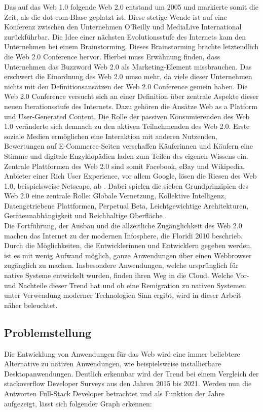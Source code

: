 \documentclass[a4paper]{scrartcl}
\begin{document}
Das auf das Web 1.0 folgende Web 2.0 entstand um 2005 und markierte somit die Zeit, als die dot-com-Blase geplatzt ist. Diese stetige Wende ist auf eine Konferenz zwischen den Unternehmen O'Reilly und MediaLive International zurückführbar. Die Idee einer nächsten Evolutionsstufe des Internets kam den Unternehmen bei einem Brainstorming. Dieses Brainstorming brachte letztendlich die Web 2.0 Conference hervor. Hierbei muss Erwähnung finden, dass Unternehmen das Buzzword Web 2.0 als Marketing-Element missbrauchen. Das erschwert die Einordnung des Web 2.0 umso mehr, da viele dieser Unternehmen nichts mit den Definitionsansätzen der Web 2.0 Conference gemein haben. Die Web 2.0 Conference versucht sich an einer Definition über zentrale Aspekte dieser neuen Iterationsstufe des Internets. Dazu gehören die Ansätze Web as a Platform und User-Generated Content. Die Rolle der passiven Konsumierenden des Web 1.0 veränderte sich demnach zu den aktiven Teilnehmenden des Web 2.0. Erste soziale Medien ermöglichen eine Interaktion mit anderen Nutzenden, Bewertungen auf E-Commerce-Seiten verschaffen Käuferinnen und Käufern eine Stimme und digitale Enzyklopädien laden zum Teilen des eigenen Wissens ein. Zentrale Plattformen des Web 2.0 sind somit Facebook, eBay und Wikipedia. Anbieter einer Rich User Experience, vor allem Google, lösen die Riesen des Web 1.0, beispielsweise Netscape, ab \autocite{Oreilly}. Dabei spielen die sieben Grundprinzipien des Web 2.0 eine zentrale Rolle: Globale Vernetzung, Kollektive Intelligenz, Datengetriebene Plattformen, Perpetual Beta, Leichtgewichtige Architekturen, Geräteunabhängigkeit und Reichhaltige Oberfläche \autocite[Kollmann und Häsel 2007, zitiert nach][137]{Kollmann}. \\

Die Fortführung, der Ausbau und die allzeitliche Zugänglichkeit des Web 2.0 machen das Internet zu der modernen Infosphere, die Floridi 2010 beschrieb. Durch die Möglichkeiten, die Entwicklerinnen und Entwicklern gegeben werden, ist es mit wenig Aufwand möglich, ganze Anwendungen über einen Webbrowser zugänglich zu machen. Insbesondere Anwendungen, welche ursprünglich für native Systeme entwickelt wurden, finden ihren Weg in die Cloud. Welche Vor- und Nachteile dieser Trend hat und ob eine Remigration zu nativen Systemen unter Verwendung moderner Technologien Sinn ergibt, wird in dieser Arbeit näher beleuchtet. 

\newpage

\subsection{Problemstellung}
Die Entwicklung von Anwendungen für das Web wird eine immer beliebtere Alternative zu nativen Anwendungen, wie beispielsweise installierbare Desktopanwendungen. Deutlich erkennbar wird der Trend bei einem Vergleich der stackoverflow Developer Surveys aus den Jahren 2015 bis 2021. Werden nun die Antworten Full-Stack Developer betrachtet und als Funktion der Jahre aufgezeigt, lässt sich folgender Graph erkennen: 
\end{document}
